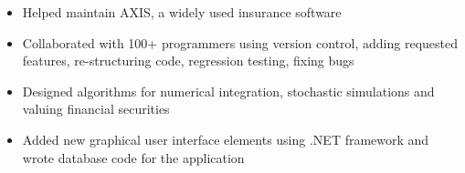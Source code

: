 \documentclass[12pt,a4paper]{altacv}
\begin{document}

\begin{fullwidth}
\makecvheader
\end{fullwidth}



\begin{itemize}
\item Helped maintain AXIS, a widely used insurance software
\item Collaborated with 100+ programmers using version control, adding requested features, re-structuring code, regression testing, fixing bugs
\item Designed algorithms for numerical integration, stochastic simulations and valuing financial securities
\item Added new graphical user interface elements using .NET framework and wrote database code for the application
\end{itemize}
\end{document}
